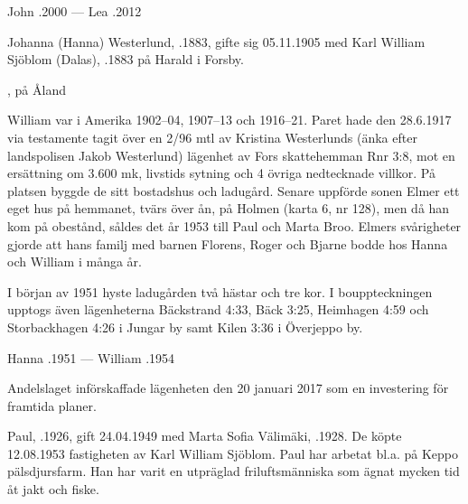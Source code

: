 John .2000  ---  Lea .2012


\jhvspace{}


Johanna (Hanna) Westerlund, .1883, gifte sig 05.11.1905 med Karl William Sjöblom (Dalas), .1883 på Harald i Forsby.
\begin{jhchildren}
  \item {}
  \item {}
  \item {}
  \item {}, på Åland
  \item {}
\end{jhchildren}

William var i Amerika 1902--04, 1907--13 och 1916--21. Paret hade den 28.6.1917 via testamente tagit över en 2/96 mtl av Kristina 	Westerlunds (änka efter landspolisen Jakob Westerlund) lägenhet av Fors skattehemman Rnr 3:8, mot en ersättning om 3.600 mk, livstids sytning och 4 övriga nedtecknade villkor. På platsen byggde de sitt bostadshus och ladugård. Senare uppförde sonen Elmer ett eget hus på hemmanet, tvärs över ån, på Holmen (karta 6, nr 128), men då han kom på obestånd, såldes det år 1953 till Paul och Marta Broo. Elmers svårigheter gjorde att hans familj med barnen Florens, Roger och Bjarne bodde hos Hanna och William i många år.

I början av 1951 hyste ladugården två hästar och tre kor. I bouppteckningen upptogs även lägenheterna Bäckstrand 4:33, Bäck 3:25, Heimhagen 4:59 och Storbackhagen 4:26 i Jungar by samt Kilen 3:36 i Överjeppo by.

Hanna .1951  --- 	William .1954





Andelslaget införskaffade lägenheten den 20 januari 2017 som en investering för framtida planer.\jhvspace{}



Paul, .1926, gift 24.04.1949 med Marta Sofia Välimäki, .1928. De köpte 12.08.1953 fastigheten av Karl William Sjöblom. Paul har arbetat bl.a. på Keppo pälsdjursfarm. Han har varit en utpräglad friluftsmänniska som ägnat mycken tid åt jakt och fiske.

